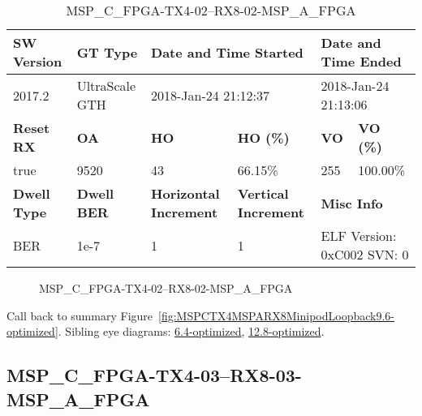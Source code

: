 \begin{table}[h]
\centering
\caption{MSP\_C\_FPGA-TX4-02--RX8-02-MSP\_A\_FPGA}
\label{tab:MSPCFPGATX402RX802MSPAFPGA9.6-optimized}
\begin{tabular}{@{}|l|l|l|l|l|l|@{}}
\toprule
\textbf{SW Version}                & \textbf{GT Type}   & \multicolumn{2}{l|}{\textbf{Date and Time Started}}            & \multicolumn{2}{l|}{\textbf{Date and Time Ended}}        \\ \midrule
2017.2                       & UltraScale GTH          & \multicolumn{2}{l|}{2018-Jan-24 21:12:37}                   & \multicolumn{2}{l|}{2018-Jan-24 21:13:06}               \\ \midrule
\textbf{Reset RX}                  & \textbf{OA} & \textbf{HO}   & \textbf{HO (\%)} & \textbf{VO} & \textbf{VO (\%)} \\ \midrule
true & 9520        & 43          & 66.15\%        & 255        & 100.00\%       \\ \midrule
\textbf{Dwell Type}                & \textbf{Dwell BER} & \textbf{Horizontal Increment} & \textbf{Vertical Increment}    & \multicolumn{2}{l|}{\textbf{Misc Info}}                  \\ \midrule
BER                            & 1e-7        & 1        & 1           & \multicolumn{2}{l|}{ELF Version: 0xC002 SVN: 0}                         \\ \bottomrule
\end{tabular}
\end{table}

\begin{figure}[h]
\caption{MSP\_C\_FPGA-TX4-02--RX8-02-MSP\_A\_FPGA} \label{fig:MSPCFPGATX402RX802MSPAFPGA9.6-optimized}
\end{figure}

Call back to summary Figure~\ref{fig:MSPCTX4MSPARX8MinipodLoopback9.6-optimized}.
Sibling eye diagrams: \hyperref[sec:MSPCFPGATX402RX802MSPAFPGA6.4-optimized]{6.4-optimized}, \hyperref[sec:MSPCFPGATX402RX802MSPAFPGA12.8-optimized]{12.8-optimized}.

\clearpage
\newpage


\subsection{MSP\_C\_FPGA-TX4-03--RX8-03-MSP\_A\_FPGA}\label{sec:MSPCFPGATX403RX803MSPAFPGA9.6-optimized}

